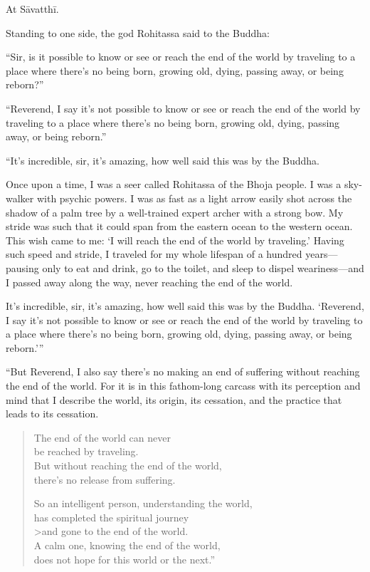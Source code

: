 \documentclass[12pt,openany]{book}%
\begin{document}
At \textsanskrit{Sāvatthī}. 

Standing to one side, the god Rohitassa said to the Buddha: 

“Sir, is it possible to know or see or reach the end of the world by traveling to a place where there’s no being born, growing old, dying, passing away, or being reborn?” 

“Reverend, I say it’s not possible to know or see or reach the end of the world by traveling to a place where there’s no being born, growing old, dying, passing away, or being reborn.” 

“It’s incredible, sir, it’s amazing, how well said this was by the Buddha. 

Once upon a time, I was a seer called Rohitassa of the Bhoja people. I was a sky-walker with psychic powers. I was as fast as a light arrow easily shot across the shadow of a palm tree by a well-trained expert archer with a strong bow. My stride was such that it could span from the eastern ocean to the western ocean. This wish came to me: ‘I will reach the end of the world by traveling.’ Having such speed and stride, I traveled for my whole lifespan of a hundred years—pausing only to eat and drink, go to the toilet, and sleep to dispel weariness—and I passed away along the way, never reaching the end of the world. 

It’s incredible, sir, it’s amazing, how well said this was by the Buddha. ‘Reverend, I say it’s not possible to know or see or reach the end of the world by traveling to a place where there’s no being born, growing old, dying, passing away, or being reborn.’” 

“But Reverend, I also say there’s no making an end of suffering without reaching the end of the world. For it is in this fathom-long carcass with its perception and mind that I describe the world, its origin, its cessation, and the practice that leads to its cessation. 

\begin{verse}%
The end of the world can never \\
be reached by traveling. \\
But without reaching the end of the world, \\
there’s no release from suffering. 

So an intelligent person, understanding the world, \\
has completed the spiritual journey \\>and gone to the end of the world. \\
A calm one, knowing the end of the world, \\
does not hope for this world or the next.” 

%
\end{verse}
\end{document}
